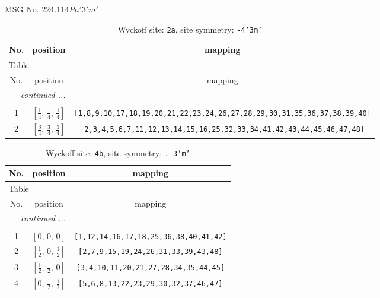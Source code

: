 \documentclass[fleqn,8pt]{jsarticle}
\begin{document}
\setcounter{MaxMatrixCols}{32}

\renewcommand{\tablename}{Table~}
\renewcommand{\figurename}{Figure~}
\begin{center}
\LARGE
MSG No. 224.114\quad$Pn'\bar{3}'m'$
\end{center}
\renewcommand{\arraystretch}{1.2}
\begin{longtable}{ccc}
\caption{Wyckoff site: {\tt 2a}, site symmetry: {\tt -4'3m'}}
 \\
 \hline \hline
No. & position & mapping \\ \hline \endfirsthead

\multicolumn{2}{l}{\tablename\ \thetable{}} \\
 \hline \hline
No. & position & mapping \\ \hline \endhead

 \hline \hline
\multicolumn{2}{r}{\footnotesize\it continued ...} \\ \endfoot

 \hline \hline
\multicolumn{2}{r}{} \\ \endlastfoot

1 & $\left[ \frac{1}{4},\, \frac{1}{4},\, \frac{1}{4} \right]$ & {\tt [1,8,9,10,17,18,19,20,21,22,23,24,26,27,28,29,30,31,35,36,37,38,39,40]} \\ \hline
2 & $\left[ \frac{3}{4},\, \frac{3}{4},\, \frac{3}{4} \right]$ & {\tt [2,3,4,5,6,7,11,12,13,14,15,16,25,32,33,34,41,42,43,44,45,46,47,48]} \\
\end{longtable}
\renewcommand{\arraystretch}{1.2}
\begin{longtable}{ccc}
\caption{Wyckoff site: {\tt 4b}, site symmetry: {\tt .-3'm'}}
 \\
 \hline \hline
No. & position & mapping \\ \hline \endfirsthead

\multicolumn{2}{l}{\tablename\ \thetable{}} \\
 \hline \hline
No. & position & mapping \\ \hline \endhead

 \hline \hline
\multicolumn{2}{r}{\footnotesize\it continued ...} \\ \endfoot

 \hline \hline
\multicolumn{2}{r}{} \\ \endlastfoot

1 & $\left[ 0,\, 0,\, 0 \right]$ & {\tt [1,12,14,16,17,18,25,36,38,40,41,42]} \\ \hline
2 & $\left[ \frac{1}{2},\, 0,\, \frac{1}{2} \right]$ & {\tt [2,7,9,15,19,24,26,31,33,39,43,48]} \\ \hline
3 & $\left[ \frac{1}{2},\, \frac{1}{2},\, 0 \right]$ & {\tt [3,4,10,11,20,21,27,28,34,35,44,45]} \\ \hline
4 & $\left[ 0,\, \frac{1}{2},\, \frac{1}{2} \right]$ & {\tt [5,6,8,13,22,23,29,30,32,37,46,47]} \\
\end{longtable}
\end{document}
